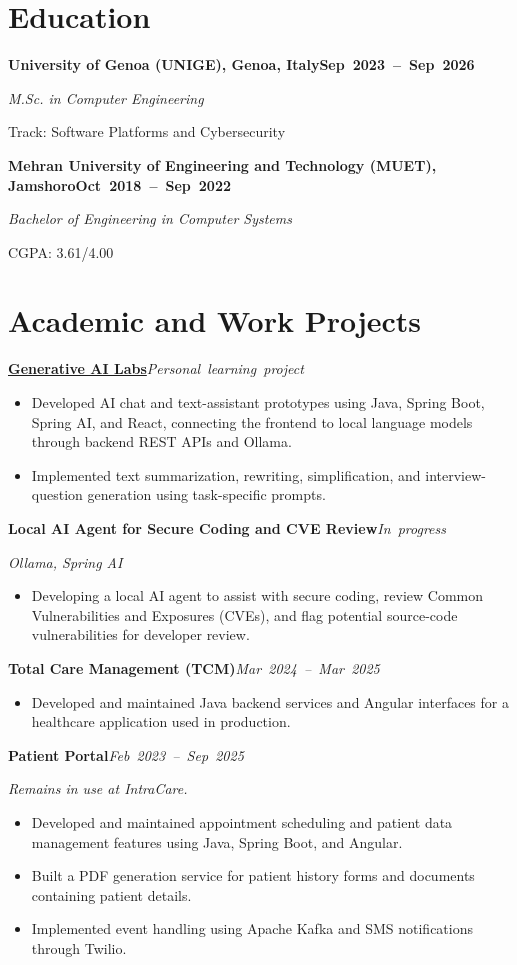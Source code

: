 \documentclass[a4paper]{article}
\newcommand{\cventry}[3]{%
  \par\addvspace{3pt}\Needspace{3.5\baselineskip}%
  \textbf{#2}\hfill\mbox{\textbf{#3}}\par\nopagebreak
  \textit{#1}\par\nopagebreak
}
\newcommand{\cvproject}[2]{%
  \par\addvspace{3pt}\Needspace{4\baselineskip}%
  \textbf{#1}\hfill\mbox{\textit{#2}}\par\nopagebreak
}
\begin{document}
\section{Education}
\cventry{M.Sc. in Computer Engineering}
  {University of Genoa (UNIGE), Genoa, Italy}{Sep 2023 -- Sep 2026}
Track: Software Platforms and Cybersecurity

\cventry{Bachelor of Engineering in Computer Systems}
  {Mehran University of Engineering and Technology (MUET), Jamshoro}{Oct 2018 -- Sep 2022}
CGPA: 3.61/4.00

\newpage
\section{Academic and Work Projects}
\cvproject{\href{https://github.com/MUHAMMADTAHIR31/java-springboot-react-ollama-labs}{Generative AI Labs}}{Personal learning project}
\begin{itemize}
  \item Developed AI chat and text-assistant prototypes using Java, Spring Boot, Spring AI, and React, connecting the frontend to local language models through backend REST APIs and Ollama.
  \item Implemented text summarization, rewriting, simplification, and interview-question generation using task-specific prompts.
\end{itemize}

\cvproject{Local AI Agent for Secure Coding and CVE Review}{In progress}
\textit{Ollama, Spring AI}
\begin{itemize}
  \item Developing a local AI agent to assist with secure coding, review Common Vulnerabilities and Exposures (CVEs), and flag potential source-code vulnerabilities for developer review.
\end{itemize}

\cvproject{Total Care Management (TCM)}{Mar 2024 -- Mar 2025}
\begin{itemize}
  \item Developed and maintained Java backend services and Angular interfaces for a healthcare application used in production.
\end{itemize}

\cvproject{Patient Portal}{Feb 2023 -- Sep 2025}
\textit{Remains in use at IntraCare.}
\begin{itemize}
  \item Developed and maintained appointment scheduling and patient data management features using Java, Spring Boot, and Angular.
  \item Built a PDF generation service for patient history forms and documents containing patient details.
  \item Implemented event handling using Apache Kafka and SMS notifications through Twilio.
\end{itemize}
\end{document}
